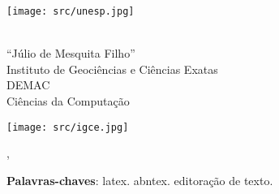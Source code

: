 \documentclass[12pt, openright, oneside, a4paper, chapter=TITLE, section=TITLE, subsection=TITLE, subsubsection=TITLE, brazil]{abntex2}
\begin{document}
\sloppy

\frenchspacing


\begin{capa}
    \thispagestyle{empty}
    \centering
    \vspace*{1cm}

    \begin{minipage}{0.2\linewidth}
        \centering
        \texttt{[image: src/unesp.jpg]}
    \end{minipage}%
    \hfill
    \begin{minipage}{0.6\linewidth}
        \centering
        {\large \imprimirinstituicao} \\
        {\large ``J\'ulio de Mesquita Filho''} \\
        {\large Instituto de Geociências e Ciências Exatas} \\
        {\large DEMAC} \\
        {\large Ciências da Computação}
    \end{minipage}%
    \hfill
    \begin{minipage}{0.2\linewidth}
        \centering
        \texttt{[image: src/igce.jpg]}
    \end{minipage}

    \vspace*{1cm}
    {\ABNTEXchapterfont\large\imprimirautor}
    \vspace*{\fill}

    {\ABNTEXchapterfont\bfseries \large \imprimirtitulo}
    \vspace*{\fill}

    {\large\imprimirtipotrabalho}
    \vspace*{\fill}

    {\large\imprimirlocal}, {\large\imprimirdata}
    \vspace*{1cm}
\end{capa}

\imprimirfolhaderosto*

\setlength{\absparsep}{18pt} %
\begin{resumo}
 \lipsum[1-4]

 \textbf{Palavras-chaves}: latex. abntex. editoração de texto.
\end{resumo}
\end{document}
